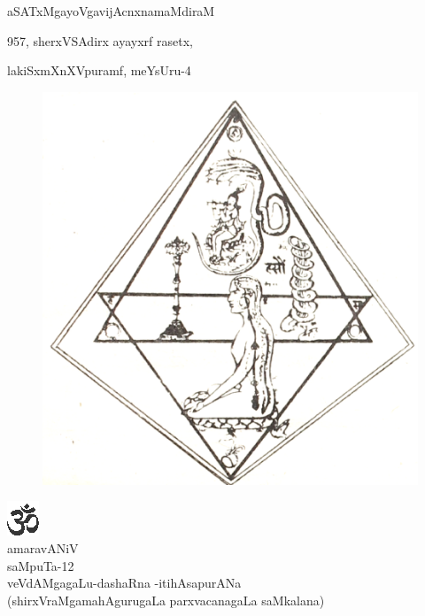 \vskip -10pt

\begin{center}

{\large aSATxMgayoVgavijAcnxnamaMdiraM}

{\normalsize 957, sherxVSAdirx ayayxrf rasetx,}

{\normalsize lakiSxmXnXVpuramf, meYsUru-4}

\end{center}

\newpage

\thispagestyle{empty}

\begin{figure}[h]
\centerline
{\includegraphics[scale=.18]{0000b.eps}}
\end{figure}

\begin{center}
{\includegraphics[scale=1.5]{om.eps}}\\[5pt]

{\large amaravANiV}\\[5pt]

{\normalsize saMpuTa-12}\\[5pt]

{\large veVdAMgagaLu-dashaRna -itihAsapurANa}\\[5pt]

{\normalsize (shirxVraMgamahAgurugaLa parxvacanagaLa saMkalana)}
\end{center}


